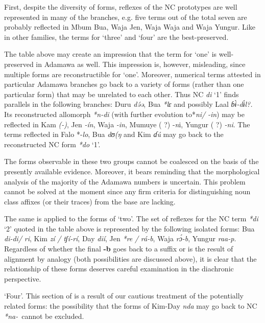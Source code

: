 First, despite the diversity of forms, reflexes of the NC prototypes are well represented in many of the branches, e.g. five terms out of the total seven are probably reflected in Mbum Bua, Waja Jen, Waja Waja and Waja Yungur. Like in other families, the terms for ‘three’ and ‘four’ are the best-preserved.

The table above may create an impression that the term for ‘one’ is well-preserved in Adamawa as well. This impression is, however, misleading, since multiple forms are reconstructible for ‘one’. Moreover, numerical terms attested in particular Adamawa branches go back to a variety of forms (rather than one particular form) that may be unrelated to each other. Thus NC \textit{di} ‘1’ finds parallels in the following branches: Duru \textit{d{\'{ə}}ə}, Bua \textit{*lɛ} and possibly Laal \textit{ɓ{\`{ɨ}}-d{\'{ɨ}}l?.} Its reconstructed allomorph \textit{*n-di} (with further evolution to*\textit{ni/} \textit{-in}) may be reflected in Kam \textit{(-{}{})}, Jen \textit{-ín}, Waja \textit{-in}, Mumuye ( ?) -\textit{n}i, Yungur ( ?) \textit{-ni}. The terms reflected in Falo *-\textit{lo}, Bua \textit{dʊ(ŋ} and Kim \textit{ɗ{\'{u}}} may go back to the reconstructed NC form \textit{*do} ‘1’.

The forms observable in these two groups cannot be coalesced on the basis of the presently available evidence. Moreover, it bears reminding that the morphological analysis of the majority of the Adamawa numbers is uncertain. This problem cannot be solved at the moment since any firm criteria for distinguishing noun class affixes (or their traces) from the base are lacking. 

The same is applied to the forms of ‘two’. The set of reflexes for the NC term \textit{*di} ‘2’ quoted in the table above is represented by the following isolated forms: Bua \textit{di-di/} \textit{ri}, Kim \textit{zí} \textit{/} \textit{tʃí-rí}, Day \textit{d{\={i}}í}, Jen \textit{*re} \textit{/}  \textit{rá-b}, Waja \textit{r{\'{ɔ}}-b}, Yungur \textit{raa-p}. Regardless of whether the final \textbf{-b} goes back to a suffix or is the result of alignment by analogy (both possibilities are discussed above), it is clear that the relationship of these forms deserves careful examination in the diachronic perspective.

‘Four’. This section of  is a result of our cautious treatment of the potentially related forms: the possibility that the forms of Kim-Day \textit{nda} may go back to NC \textit{*na}\textit{-}~cannot be excluded.

